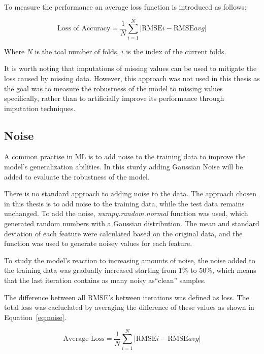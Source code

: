 To measure the performance an average loss function is introduced as follows:

\begin{tcolorbox}[arc=0pt,boxrule=0.5pt]
\begin{equation}
\label{eq:average_loss}
\text{Loss of Accuracy} = \frac{1}{N} \sum_{i=1}^{N} |\text{RMSE}i -
\text{RMSE}{avg}|
\end{equation}
\end{tcolorbox}

Where $N$ is the toal number of folds, $i$ is the index of the current folds.

It is worth noting that imputations of missing values can be used to mitigate
the loss
caused by missing data.
However, this approach was not used in this thesis as the goal
was to measure the robustness of the model to missing values specifically,
rather than to
artificially improve its performance through imputation techniques.

\subsection{Noise}\label{subsec:noise}
A common practise in \ac{ML} is to add noise to the training data to improve
the model's
generalization abilities.
In this sturdy adding Gaussian Noise will be added to evaluate the robustness
of the model.

There is no standard approach to adding noise to the data. The approach
chosen in this thesis
is to add noise to the training data, while the test data remains unchanged.
To add the noise, \textit{numpy.random.normal} function was used, which
generated random numbers
with a Gaussian distribution.
The mean and standard deviation of each feature were calculated based on the
original data, and
the function was used to generate noisey values for each feature.

To study the model's reaction to increasing amounts of noise, the noise added
to the training
data was gradually increased starting from 1\% to 50\%, which means that the
last iteration
contains as many noisy as``clean'' samples.

The difference between all \ac{RMSE}'s between iterations was defined as loss.
The total loss was cacluclated by averaging the difference of these values as
shown in
Equation~\ref{eq:noise}.

\begin{tcolorbox}[arc=0pt,boxrule=0.5pt]
\begin{equation}
\text{Average Loss} = \frac{1}{N} \sum_{i=1}^{N} |\text{RMSE}i -
\text{RMSE}{avg}|\label
{eq:noise}
\end{equation}
\end{tcolorbox}

